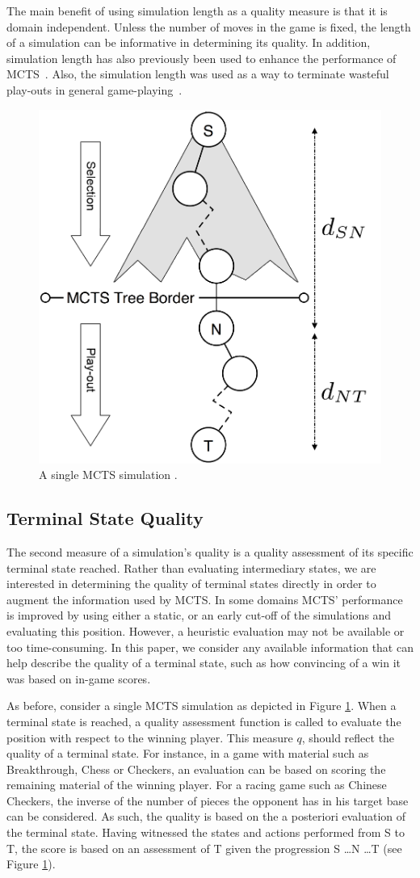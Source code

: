 \documentclass{ecai2014}
\newcommand{\node}[1]{{\fontfamily{phv}\selectfont#1}}
\begin{document}
The main benefit of using simulation length as a quality measure is that it is domain independent. Unless the number of moves in the game is fixed, the length of a simulation can be informative in determining its quality. In addition, simulation length has also previously been used to enhance the performance of MCTS~\cite{Enzenberger10Fuego,keller13thts,roschke2013cc}. Also, the simulation length was used as a way to terminate wasteful play-outs in general game-playing~\cite{finnsson2012generalized}.
\begin{figure}[t]
	\centering
	\includegraphics[width=.27\textwidth]{img/figure2_new.png}
	\caption{A single MCTS simulation \cite{finnsson2012generalized}.}
	\label{fig:mcts-simulation}
\end{figure}
\subsection{Terminal State Quality}
\label{sub:termqual}

The second measure of a simulation's quality is a quality assessment of its specific terminal state reached. Rather than evaluating intermediary states, we are interested in determining the quality of terminal states directly in order to augment the information used by MCTS. In some domains MCTS' performance is improved by using either a static, or an early cut-off of the simulations and evaluating this position. However, a heuristic evaluation may not be available or too time-consuming. In this paper, we consider any available information that can help describe the quality of a terminal state, such as how convincing of a win it was based on in-game scores.  

As before, consider a single MCTS simulation as depicted in Figure \ref{fig:mcts-simulation}. When a terminal state is reached, a quality assessment function is called to evaluate the position with respect to the winning player. This measure $q$, should reflect the quality of a terminal state. For instance, in a game with material such as Breakthrough, Chess or Checkers, an evaluation can be based on scoring the remaining material of the winning player. For a racing game such as Chinese Checkers, the inverse of the number of pieces the opponent has in his target base can be considered. As such, the quality is based on the a posteriori evaluation of the terminal state. Having witnessed the states and actions performed from \node{S} to \node{T}, the score is based on an assessment of \node{T} given the progression \node{S} \ldots \node{N} \ldots \node{T} (see Figure \ref{fig:mcts-simulation}).
\end{document}
